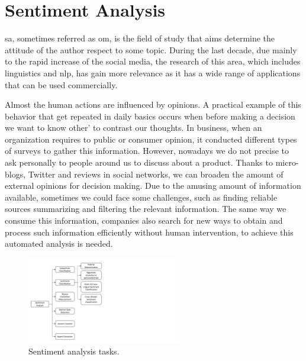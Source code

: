 
\section{Sentiment Analysis}
\label{sec:sentiment_analysis}

\acrfull{sa}, sometimes referred as \acrfull{om}, is the field of study that aims determine the attitude of the author respect to some topic. During the last decade, due mainly to the rapid increase of the social media, the research of this area, which includes linguistics and \acrfull{nlp}, has gain more relevance as it has a wide range of applications that can be used commercially.

Almost the human actions are influenced by opinions. A practical example of this behavior that get repeated in daily basics occurs when before making a decision we want to know other' to contrast our thoughts. In business, when an organization requires to public or consumer opinion, it conducted different types of surveys to gather this information. However, nowadays we do not precise to ask personally to people around us to discuss about a product. Thanks to micro-blogs, Twitter and reviews in social networks, we can broaden the amount of external opinions for decision making. Due to the amusing amount of information available, sometimes we could face some challenges, such as finding reliable sources summarizing and filtering the relevant information. The same way we consume this information, companies also search for new ways to obtain and process such information efficiently without human intervention, to achieve this automated analysis is needed\cite{liu2012sentiment}.

\begin{figure}[!htp]
  \center
  \includegraphics[width=0.6\textwidth]{figures/sentiment_analysis_tasks}
  \caption{Sentiment analysis tasks\cite{ravi2015survey}.}
  \label{fig:sentiment_analysis_tasks}
\end{figure}

